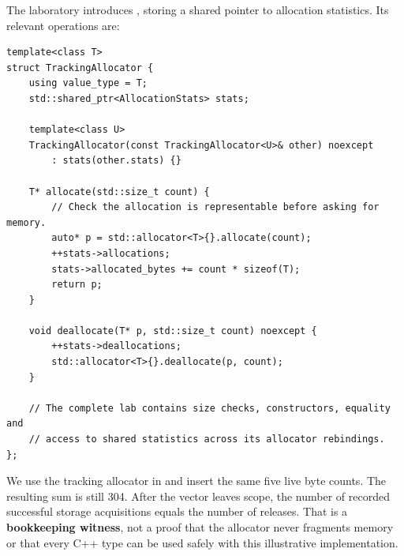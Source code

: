 The laboratory introduces , storing a shared pointer to allocation statistics. Its relevant operations are:

\begin{verbatim}
template<class T>
struct TrackingAllocator {
    using value_type = T;
    std::shared_ptr<AllocationStats> stats;

    template<class U>
    TrackingAllocator(const TrackingAllocator<U>& other) noexcept
        : stats(other.stats) {}

    T* allocate(std::size_t count) {
        // Check the allocation is representable before asking for memory.
        auto* p = std::allocator<T>{}.allocate(count);
        ++stats->allocations;
        stats->allocated_bytes += count * sizeof(T);
        return p;
    }

    void deallocate(T* p, std::size_t count) noexcept {
        ++stats->deallocations;
        std::allocator<T>{}.deallocate(p, count);
    }

    // The complete lab contains size checks, constructors, equality and
    // access to shared statistics across its allocator rebindings.
};
\end{verbatim}

We use the tracking allocator in  and insert the same five live byte counts. The resulting sum is still 304. After the vector leaves scope, the number of recorded successful storage acquisitions equals the number of releases. That is a \textbf{bookkeeping witness}, not a proof that the allocator never fragments memory or that every C++ type can be used safely with this illustrative implementation.

